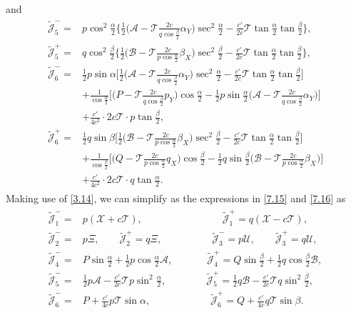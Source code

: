 \documentclass[11pt,reqno]{article}
\newcommand{\fr}{\frac}
\numberwithin{equation}{section}
\begin{document}
and
\begin{align}\label{7.16}
\begin{split}
\widetilde{\mathcal{J}}_{5}^-=& p\cos^2\fr{\alpha}{2}\Big\{\fr{1}{2} \Big(\mathcal{A}-\mathcal{T}\fr{2c}{q\cos\fr{\beta}{2}}\alpha_Y\Big)\sec^2\fr{\alpha}{2} -\fr{c'}{2c}\mathcal{T}\tan\fr{\alpha}{2}\tan\fr{\beta}{2}\Big\}, \\
\widetilde{\mathcal{J}}_{5}^+=& q\cos^2\fr{\beta}{2}\Big\{\fr{1}{2} \Big(\mathcal{B}-\mathcal{T}\fr{2c}{p\cos\fr{\alpha}{2}}\beta_X\Big)\sec^2\fr{\beta}{2} -\fr{c'}{2c}\mathcal{T}\tan\fr{\alpha}{2}\tan\fr{\beta}{2}\Big\}, \\
\widetilde{\mathcal{J}}_{6}^-=&\fr{1}{2}p\sin\alpha\Big[\fr{1}{2} \Big(\mathcal{A}-\mathcal{T}\fr{2c}{q\cos\fr{\beta}{2}}\alpha_Y\Big)\sec^2\fr{\alpha}{2} -\fr{c'}{2c}\mathcal{T}\tan\fr{\alpha}{2}\tan\fr{\beta}{2}\Big] \\ &+\fr{1}{\cos\fr{\alpha}{2}}\Big[\Big(P-\mathcal{T}\fr{2c}{q\cos\fr{\beta}{2}}p_Y\Big)\cos\fr{\alpha}{2} -\fr{1}{2}p\sin\fr{\alpha}{2}\Big(\mathcal{A}-\mathcal{T}\fr{2c}{q\cos\fr{\beta}{2}}\alpha_Y\Big) \Big] \\
&+\fr{c'}{4c^2}\cdot 2c\mathcal{T}\cdot p\tan\fr{\beta}{2}, \\
\widetilde{\mathcal{J}}_{6}^+=&\fr{1}{2}q\sin\beta\Big[\fr{1}{2} \Big(\mathcal{B}-\mathcal{T}\fr{2c}{p\cos\fr{\alpha}{2}}\beta_X\Big)\sec^2\fr{\beta}{2} -\fr{c'}{2c}\mathcal{T}\tan\fr{\alpha}{2}\tan\fr{\beta}{2}\Big] \\ &+\fr{1}{\cos\fr{\beta}{2}}\Big[\Big(Q-\mathcal{T}\fr{2c}{p\cos\fr{\alpha}{2}}q_X\Big)\cos\fr{\beta}{2} -\fr{1}{2}q\sin\fr{\beta}{2}\Big(\mathcal{B}-\mathcal{T}\fr{2c}{p\cos\fr{\alpha}{2}}\beta_X\Big) \Big] \\
&+\fr{c'}{4c^2}\cdot 2c\mathcal{T}\cdot q\tan\fr{\alpha}{2}.
\end{split}
\end{align}
Making use of \eqref{3.14}, we can simplify as the expressions in \eqref{7.15} and \eqref{7.16} as
\begin{align}\label{7.17}
\begin{split}
\widetilde{\mathcal{J}}_{1}^-=&p(\mathcal{X}+c\mathcal{T}),\qquad  \qquad  \qquad  \qquad
\widetilde{\mathcal{J}}_{1}^+=q(\mathcal{X}-c\mathcal{T}), \\
\widetilde{\mathcal{J}}_{2}^-=&p\Xi, \qquad \widetilde{\mathcal{J}}_{2}^+=q\Xi, \qquad \qquad \quad
\widetilde{\mathcal{J}}_{3}^-=p\mathcal{U}, \qquad \widetilde{\mathcal{J}}_{3}^+=q\mathcal{U}, \\
\widetilde{\mathcal{J}}_{4}^-=& P\sin\fr{\alpha}{2} +\fr{1}{2}p\cos\fr{\alpha}{2}\mathcal{A}, \qquad \quad \ \
\widetilde{\mathcal{J}}_{4}^+=  Q\sin\fr{\beta}{2} +\fr{1}{2}q\cos\fr{\beta}{2}\mathcal{B}, \\
\widetilde{\mathcal{J}}_{5}^-=& \fr{1}{2}p\mathcal{A}-\fr{c'}{2c}\mathcal{T}p\sin^2\fr{\alpha}{2}, \qquad \qquad
\widetilde{\mathcal{J}}_{5}^+= \fr{1}{2}q\mathcal{B}-\fr{c'}{2c}\mathcal{T}q\sin^2\fr{\beta}{2}, \\
\widetilde{\mathcal{J}}_{6}^-=& P +\fr{c'}{4c}p\mathcal{T}\sin\alpha,  \qquad \qquad \qquad
\widetilde{\mathcal{J}}_{6}^+= Q +\fr{c'}{4c}q\mathcal{T}\sin\beta.
\end{split}
\end{align}
\end{document}
